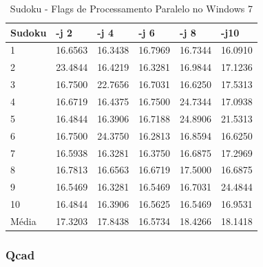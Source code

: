 \begin{table}[!ht]
\centering
\caption{Sudoku - Flags de Processamento Paralelo no Windows 7}
\label{tab:flag_processamento_paralelo:windows:sudoku}
\begin{tabular}{llllll}
\textbf{Sudoku} & \textbf{-j 2} & \textbf{-j 4} & \textbf{-j 6} & \textbf{-j 8} & \textbf{-j10}  \\ \toprule
1        & 16.6563 & 16.3438 & 16.7969 & 16.7344 & 16.0910  \\ 
2        & 23.4844 & 16.4219 & 16.3281 & 16.9844 & 17.1236  \\ 
3        & 16.7500 & 22.7656 & 16.7031 & 16.6250 & 17.5313  \\ 
4        & 16.6719 & 16.4375 & 16.7500 & 24.7344 & 17.0938  \\ 
5        & 16.4844 & 16.3906 & 16.7188 & 24.8906 & 21.5313  \\ 
6        & 16.7500 & 24.3750 & 16.2813 & 16.8594 & 16.6250  \\ 
7        & 16.5938 & 16.3281 & 16.3750 & 16.6875 & 17.2969  \\ 
8        & 16.7813 & 16.6563 & 16.6719 & 17.5000 & 16.6875  \\ 
9        & 16.5469 & 16.3281 & 16.5469 & 16.7031 & 24.4844  \\ 
10       & 16.4844 & 16.3906 & 16.5625 & 16.5469 & 16.9531  \\ \bottomrule
Média    & 17.3203 & 17.8438 & 16.5734 & 18.4266 & 18.1418  \\ 
\end{tabular}
\end{table}

\clearpage
\subsubsection*{Qcad}

